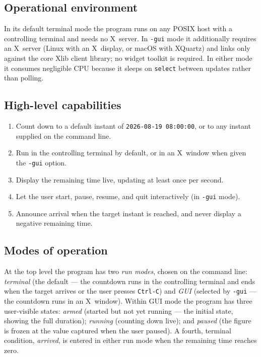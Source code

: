 \documentclass[12pt]{article}
\newcommand{\code}[1]{\texttt{#1}}
\begin{document}
\subsection{Operational environment}

In its default terminal mode the program runs on any POSIX host with a
controlling terminal and needs no X~server.  In \code{-gui} mode it
additionally requires an X~server (Linux with an X~display, or macOS with
XQuartz) and links only against the core Xlib client library; no widget
toolkit is required.  In either mode it consumes negligible CPU because it
sleeps on \code{select} between updates rather than polling.

\subsection{High-level capabilities}

\begin{enumerate}[noitemsep]
  \item Count down to a default instant of \code{2026-08-19 08:00:00},
        or to any instant supplied on the command line.
  \item Run in the controlling terminal by default, or in an X~window
        when given the \code{-gui} option.
  \item Display the remaining time live, updating at least once per
        second.
  \item Let the user start, pause, resume, and quit interactively
        (in \code{-gui} mode).
  \item Announce arrival when the target instant is reached, and never
        display a negative remaining time.
\end{enumerate}

\subsection{Modes of operation}

At the top level the program has two \emph{run modes}, chosen on the
command line: \emph{terminal} (the default --- the countdown runs in the
controlling terminal and ends when the target arrives or the user presses
\code{Ctrl-C}) and \emph{GUI} (selected by \code{-gui} --- the countdown
runs in an X~window).  Within GUI mode the program has three user-visible
states: \emph{armed} (started but not yet running --- the initial state,
showing the full duration); \emph{running} (counting down live); and
\emph{paused} (the figure is frozen at the value captured when the user
paused).  A fourth, terminal condition, \emph{arrived}, is entered in
either run mode when the remaining time reaches zero.
\end{document}
